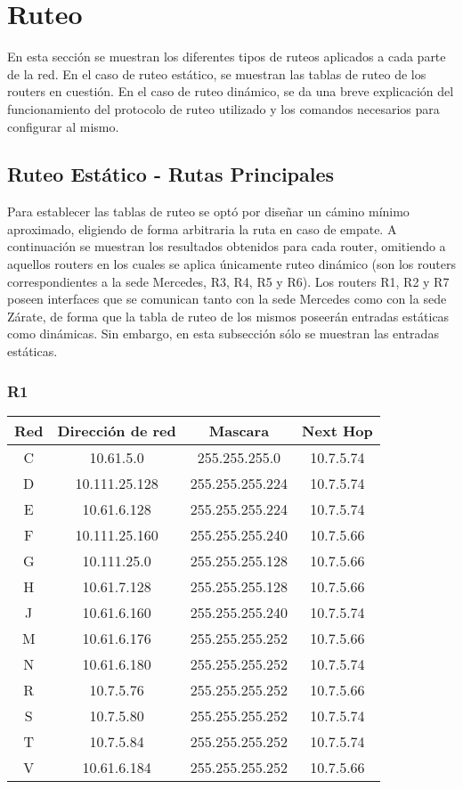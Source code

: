 \section{Ruteo}
En esta sección se muestran los diferentes tipos de ruteos aplicados a cada parte de la red. En el caso de 
ruteo estático, se muestran las tablas de ruteo de los routers en cuestión. En el caso de ruteo dinámico, 
se da una breve explicación del funcionamiento del protocolo de ruteo utilizado y los comandos necesarios
para configurar al mismo.

\subsection{Ruteo Estático - Rutas Principales}
Para establecer las tablas de ruteo se optó por diseñar un cámino mínimo aproximado, eligiendo 
de forma arbitraria la ruta en caso de empate. A continuación se muestran los resultados obtenidos 
para cada router, omitiendo a aquellos routers en los cuales se aplica únicamente ruteo dinámico (son los 
routers correspondientes a la sede Mercedes, R3, R4, R5 y R6). Los routers R1, R2
y R7 poseen interfaces que se comunican tanto con la sede Mercedes como con la sede Zárate, de forma que la
tabla de ruteo de los mismos poseerán entradas estáticas como dinámicas. Sin embargo, en esta subsección sólo 
se muestran las entradas estáticas.

\subsubsection{R1}
\begin{table}[!htbp]
\centering
  \begin{tabular}{|c|c|c|c|}
    \hline
	Red & Dirección de red & Mascara & Next Hop\\ \hline
	C & 10.61.5.0 & 255.255.255.0 & 10.7.5.74   \\ \hline
	D & 10.111.25.128 & 255.255.255.224 & 10.7.5.74 \\ \hline
	E & 10.61.6.128 & 255.255.255.224 & 10.7.5.74 \\ \hline
	F & 10.111.25.160 & 255.255.255.240 & 10.7.5.66 \\ \hline
	G & 10.111.25.0 & 255.255.255.128 & 10.7.5.66 \\ \hline
	H & 10.61.7.128 & 255.255.255.128 & 10.7.5.66 \\ \hline
	J & 10.61.6.160 & 255.255.255.240 & 10.7.5.74 \\ \hline
	M & 10.61.6.176 & 255.255.255.252 & 10.7.5.66 \\ \hline
	N & 10.61.6.180 & 255.255.255.252 & 10.7.5.74 \\ \hline
	R & 10.7.5.76 & 255.255.255.252 & 10.7.5.66 \\ \hline
	S & 10.7.5.80 & 255.255.255.252 & 10.7.5.74 \\ \hline
	T & 10.7.5.84 & 255.255.255.252 & 10.7.5.74 \\ \hline
	V & 10.61.6.184 & 255.255.255.252 & 10.7.5.66 \\
    \hline
  \end{tabular}
\end{table}

